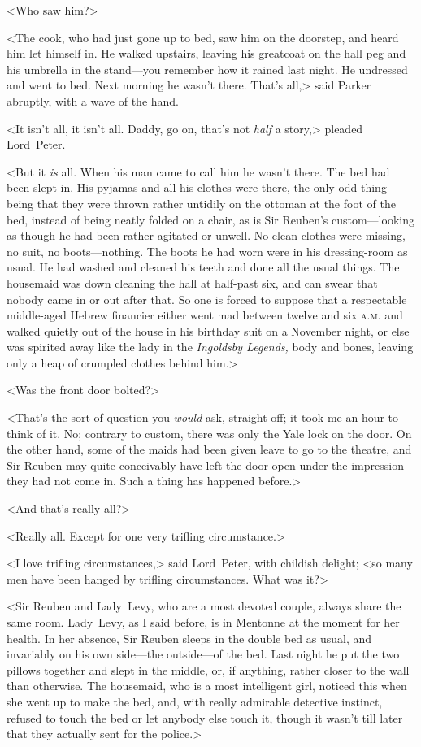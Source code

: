 <Who saw him?>

<The cook, who had just gone up to bed, saw him on the doorstep, and heard him let himself in. He walked upstairs, leaving his greatcoat on the hall peg and his umbrella in the stand—you remember how it rained last night. He undressed and went to bed. Next morning he wasn't there. That's all,> said Parker abruptly, with a wave of the hand.

<It isn't all, it isn't all. Daddy, go on, that's not \textit{half} a story,> pleaded Lord~Peter.

<But it \textit{is} all. When his man came to call him he wasn't there. The bed had been slept in. His pyjamas and all his clothes were there, the only odd thing being that they were thrown rather untidily on the ottoman at the foot of the bed, instead of being neatly folded on a chair, as is Sir Reuben's custom—looking as though he had been rather agitated or unwell. No clean clothes were missing, no suit, no boots—nothing. The boots he had worn were in his dressing-room as usual. He had washed and cleaned his teeth and done all the usual things. The housemaid was down cleaning the hall at half-past six, and can swear that nobody came in or out after that. So one is forced to suppose that a respectable middle-aged Hebrew financier either went mad between twelve and six \textsc{a.m.} and walked quietly out of the house in his birthday suit on a November night, or else was spirited away like the lady in the \textit{Ingoldsby Legends,} body and bones, leaving only a heap of crumpled clothes behind him.>

<Was the front door bolted?>

<That's the sort of question you \textit{would} ask, straight off; it took me an hour to think of it. No; contrary to custom, there was only the Yale lock on the door. On the other hand, some of the maids had been given leave to go to the theatre, and Sir Reuben may quite conceivably have left the door open under the impression they had not come in. Such a thing has happened before.>

<And that's really all?>

<Really all. Except for one very trifling circumstance.>

<I love trifling circumstances,> said Lord~Peter, with childish delight; <so many men have been hanged by trifling circumstances. What was it?>

<Sir Reuben and Lady~Levy, who are a most devoted couple, always share the same room. Lady~Levy, as I said before, is in Mentonne at the moment for her health. In her absence, Sir Reuben sleeps in the double bed as usual, and invariably on his own side—the outside—of the bed. Last night he put the two pillows together and slept in the middle, or, if anything, rather closer to the wall than otherwise. The housemaid, who is a most intelligent girl, noticed this when she went up to make the bed, and, with really admirable detective instinct, refused to touch the bed or let anybody else touch it, though it wasn't till later that they actually sent for the police.>

